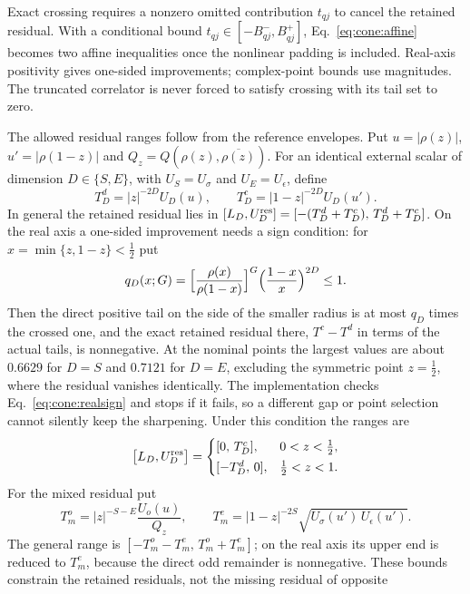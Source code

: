 \documentclass[11pt,a4paper]{article}
\numberwithin{equation}{section}
\begin{document}
Exact crossing requires a nonzero omitted contribution $t_{qj}$ to cancel the retained residual. With a conditional
bound $t_{qj}\in[-B^-_{qj},B^+_{qj}]$, Eq.~\eqref{eq:cone:affine} becomes two affine inequalities once the nonlinear
padding is included. Real-axis positivity gives one-sided improvements; complex-point bounds use magnitudes. The
truncated correlator is never forced to satisfy crossing with its tail set to zero.

The allowed residual ranges follow from the reference envelopes. Put $u=|\rho(z)|$, $u'=|\rho(1-z)|$ and
$Q_z=Q(\rho(z),\overline{\rho(z)})$. For an identical external scalar of dimension $D\in\{S,E\}$, with $U_S=U_\sigma$
and $U_E=U_\epsilon$, define
\begin{equation}
 T_D^d=|z|^{-2D}U_D(u),\qquad T_D^c=|1-z|^{-2D}U_D(u').
\end{equation}
In general the retained residual lies in $[L_D,U^{\rm res}_D]=[-(T_D^d+T_D^c),\,T_D^d+T_D^c]$. On the real axis a one-sided improvement
needs a sign condition: for $x=\min\{z,1-z\}<\frac12$ put
\begin{equation}
 q_D(x;G)=\Bigl[\frac{\rho(x)}{\rho(1-x)}\Bigr]^G\Bigl(\frac{1-x}{x}\Bigr)^{2D}\le1 .
 \label{eq:cone:realsign}
\end{equation}
Then the direct positive tail on the side of the smaller radius is at most $q_D$ times the crossed one, and the exact
retained residual there, $T^c-T^d$ in terms of the actual tails, is nonnegative. At the nominal points the largest
values are about $0.6629$ for $D=S$ and $0.7121$ for $D=E$, excluding the symmetric point $z=\frac12$, where the residual
vanishes identically. The implementation checks Eq.~\eqref{eq:cone:realsign} and stops if it fails, so a different gap
or point selection cannot silently keep the sharpening. Under this condition the ranges are
\begin{equation}
 \bigl[L_D,U^{\rm res}_D\bigr]=\begin{cases}[0,\,T_D^c],&0<z<\frac12,\\[2pt] [-T_D^d,\,0],&\frac12<z<1.\end{cases}
\end{equation}
For the mixed residual put
\begin{equation}
 T_m^o=|z|^{-S-E}\frac{U_o(u)}{Q_z},\qquad T_m^e=|1-z|^{-2S}\sqrt{U_\sigma(u')\,U_\epsilon(u')} .
\end{equation}
The general range is $[-T_m^o-T_m^e,\,T_m^o+T_m^e]$; on the real axis its upper end is reduced to $T_m^e$, because the
direct odd remainder is nonnegative. These bounds constrain the retained residuals, not the missing residual of opposite
\end{document}
